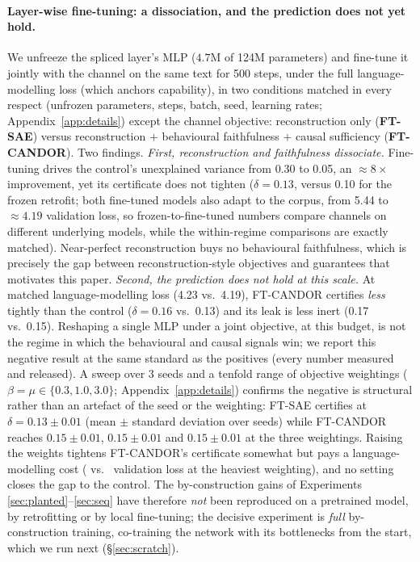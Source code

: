 \documentclass[11pt]{article}
\providecommand{\gptParams}{124}\providecommand{\gptLayer}{9}\providecommand{\gptNLayer}{12}
\providecommand{\gptSaeDelta}{0.10}\providecommand{\gptCandorDelta}{0.03}\providecommand{\gptSaeSwap}{0.10}\providecommand{\gptCandorSwap}{0.03}
\providecommand{\gptSaeRecon}{0.30}\providecommand{\gptCandorRecon}{0.40}\providecommand{\gptSaeRecovered}{70.0}\providecommand{\gptCandorRecovered}{90.0}
\providecommand{\ftSteps}{500}\providecommand{\ftOrigLoss}{5.44}
\providecommand{\ftSaeDelta}{0.13}\providecommand{\ftCandorDelta}{0.16}
\providecommand{\ftSaeSwap}{0.15}\providecommand{\ftCandorSwap}{0.17}
\providecommand{\ftSaeRecon}{0.05}\providecommand{\ftCandorRecon}{0.08}
\providecommand{\ftSaeLoss}{4.19}\providecommand{\ftCandorLoss}{4.23}
\providecommand{\ftReconGain}{8}
\providecommand{\ftSweepSeeds}{3}
\providecommand{\ftSweepSaeDelta}{0.13}\providecommand{\ftSweepSaeDeltaStd}{0.01}
\providecommand{\ftSweepWeightLow}{0.3}\providecommand{\ftSweepWeightMid}{1.0}
\providecommand{\ftSweepWeightHigh}{3.0}
\providecommand{\ftSweepCandorDeltaLow}{0.15}\providecommand{\ftSweepCandorDeltaLowStd}{0.01}
\providecommand{\ftSweepCandorDeltaMid}{0.15}\providecommand{\ftSweepCandorDeltaMidStd}{0.01}
\providecommand{\ftSweepCandorDeltaHigh}{0.15}\providecommand{\ftSweepCandorDeltaHighStd}{0.01}
\begin{document}
\paragraph{Layer-wise fine-tuning: a dissociation, and the prediction does not yet hold.}
We unfreeze the spliced layer's MLP ($4.7$M of \gptParams{}M parameters) and fine-tune it
jointly with the channel on the same text for \ftSteps{} steps, under the full
language-modelling loss (which anchors capability), in two conditions matched in every
respect (unfrozen parameters, steps, batch, seed, learning rates;
Appendix~\ref{app:details}) except the channel objective: reconstruction only
(\textbf{FT-SAE}) versus reconstruction $+$ behavioural faithfulness $+$ causal
sufficiency (\textbf{FT-CANDOR}). Two findings. \emph{First, reconstruction and
faithfulness dissociate.} Fine-tuning drives the control's unexplained variance from
\gptSaeRecon{} to \ftSaeRecon{}, an $\approx\ftReconGain{}\times$ improvement, yet its
certificate does not tighten ($\delta=\ftSaeDelta{}$, versus \gptSaeDelta{} for the
frozen retrofit; both fine-tuned models also adapt to the corpus, from \ftOrigLoss{} to
$\approx\ftSaeLoss{}$ validation loss, so frozen-to-fine-tuned numbers compare channels
on different underlying models, while the within-regime comparisons are exactly
matched). Near-perfect reconstruction buys no behavioural faithfulness, which is
precisely the gap between reconstruction-style objectives and guarantees that motivates
this paper. \emph{Second, the prediction does not hold at this scale.} At matched
language-modelling loss (\ftCandorLoss{} vs.\ \ftSaeLoss{}), FT-CANDOR certifies
\emph{less} tightly than the control ($\delta=\ftCandorDelta{}$ vs.\ \ftSaeDelta{}) and
its leak is less inert (\ftCandorSwap{} vs.\ \ftSaeSwap{}). Reshaping a single MLP under
a joint objective, at this budget, is not the regime in which the
behavioural and causal signals win; we report this negative result at the same standard
as the positives (every number measured and released). A sweep over \ftSweepSeeds{}
seeds and a tenfold range of objective weightings ($\beta=\mu\in\{\ftSweepWeightLow,
\ftSweepWeightMid, \ftSweepWeightHigh\}$; Appendix~\ref{app:details}) confirms the
negative is structural rather than an artefact of the seed or the weighting: FT-SAE
certifies at $\delta=\ftSweepSaeDelta\pm\ftSweepSaeDeltaStd$ (mean $\pm$ standard
deviation over seeds) while FT-CANDOR reaches
$\ftSweepCandorDeltaLow\pm\ftSweepCandorDeltaLowStd$,
$\ftSweepCandorDeltaMid\pm\ftSweepCandorDeltaMidStd$ and
$\ftSweepCandorDeltaHigh\pm\ftSweepCandorDeltaHighStd$ at the three weightings.
Raising the weights tightens FT-CANDOR's certificate somewhat but pays a
language-modelling cost (\ftSweepCandorLossHigh{} vs.\ \ftSweepSaeLoss{} validation
loss at the heaviest weighting), and no setting closes the gap to the control.
The by-construction gains of Experiments \ref{sec:planted}--\ref{sec:seq} have therefore
\emph{not} been reproduced on a pretrained model, by retrofitting or by local
fine-tuning; the decisive experiment is \emph{full} by-construction training,
co-training the network with its bottlenecks from the start, which we run next
(\S\ref{sec:scratch}).
\end{document}
